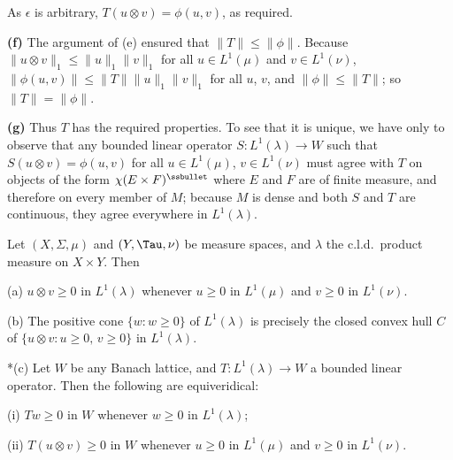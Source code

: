 {

\noindent As $\epsilon$ is arbitrary, $T(u\otimes v)=\phi(u,v)$, as
required.\ \Qed

\medskip

{\bf (f)} The argument of (e) ensured that $\|T\|\le\|\phi\|$.
Because $\|u\otimes v\|_1\le\|u\|_1\|v\|_1$ for all $u\in L^1(\mu)$ and
$v\in L^1(\nu)$, $\|\phi(u,v)\|\le\|T\|\|u\|_1\|v\|_1$ for all $u$, $v$,
and $\|\phi\|\le\|T\|$;  so $\|T\|=\|\phi\|$.

\medskip

{\bf (g)} Thus $T$ has the required properties.   To see that it is
unique, we have only to observe that any bounded linear operator
$S:L^1(\lambda)\to W$ such that $S(u\otimes v)=\phi(u,v)$ for all $u\in
L^1(\mu)$, $v\in L^1(\nu)$ must agree with $T$ on objects of the form
$\chi(E\times F)^{\ssbullet}$ where $E$ and $F$ are of finite measure,
and
therefore on every member of $M$;  because $M$ is dense and both $S$ and
$T$ are continuous, they agree everywhere in $L^1(\lambda)$.
}

 Let $(X,\Sigma,\mu)$ and $(Y,\Tau,\nu)$ be
measure spaces, and $\lambda$ the c.l.d.\ product measure on $X\times
Y$.   Then

(a)  $u\otimes v\ge 0$ in
$L^1(\lambda)$ whenever $u\ge 0$ in $L^1(\mu)$ and $v\ge 0$ in
$L^1(\nu)$.

(b) The positive cone $\{w:w\ge 0\}$ of
$L^1(\lambda)$ is precisely the closed
convex hull $C$ of $\{u\otimes v:u\ge 0,\,v\ge 0\}$ in $L^1(\lambda)$.

*(c) Let $W$ be any Banach lattice, and $T:L^1(\lambda)\to W$ a
bounded linear operator.   Then
the following are equiveridical:

\quad(i) $Tw\ge 0$ in $W$ whenever $w\ge 0$ in
$L^1(\lambda)$;

\quad(ii) $T(u\otimes v)\ge 0$ in $W$ whenever $u\ge 0$ in
$L^1(\mu)$ and $v\ge 0$ in $L^1(\nu)$.

